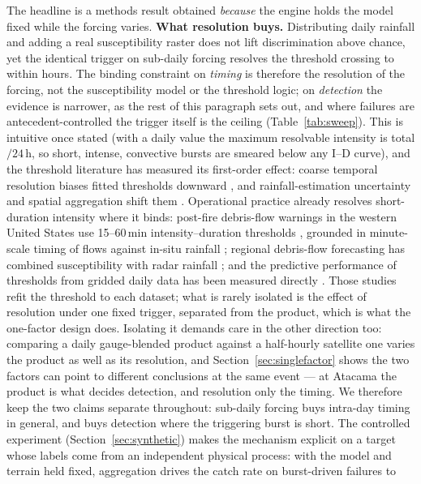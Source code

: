 \documentclass[authoryear,preprint,review,12pt]{elsarticle}
\begin{document}
The headline is a methods result obtained \emph{because} the engine holds the
model fixed while the forcing varies. \textbf{What resolution buys.}
Distributing daily rainfall and adding a real susceptibility raster does not lift
discrimination above chance, yet the identical trigger on sub-daily forcing
resolves the threshold crossing to within hours. The binding constraint on
\emph{timing} is therefore the resolution of the forcing, not the susceptibility model or the
threshold logic; on \emph{detection} the evidence is narrower, as the rest of this paragraph sets out, and where failures are antecedent-controlled the trigger itself is the ceiling (Table~\ref{tab:sweep}). This is intuitive once stated (with a daily value the maximum
resolvable intensity is total$/24$\,h, so short, intense, convective bursts are
smeared below any I--D curve), and the threshold literature has measured its first-order effect: coarse temporal resolution biases fitted thresholds downward \citep{marra2019,gariano2020}, and rainfall-estimation uncertainty and spatial aggregation shift them \citep{nikolopoulos2014,marra2017}. Operational practice already resolves short-duration intensity where it binds:
post-fire debris-flow warnings in the western United States use 15--60\,min
intensity--duration thresholds \citep{staley2017}, grounded in minute-scale
timing of flows against in-situ rainfall \citep{kean2011}; regional debris-flow
forecasting has combined susceptibility with radar rainfall \citep{berenguer2015};
and the predictive performance of thresholds from gridded daily data has been
measured directly \citep{leonarduzzi2017}. Those studies refit the threshold to
each dataset; what is rarely isolated is the effect of resolution under one fixed trigger, separated from the product, which is what the one-factor design does. Isolating it
demands care in the other direction too: comparing a daily gauge-blended product
against a half-hourly satellite one varies the product as well as its resolution,
and Section~\ref{sec:singlefactor} shows the two factors can point to different
conclusions at the same event --- at Atacama the product is what decides detection,
and resolution only the timing. We therefore keep the two claims separate
throughout: sub-daily forcing buys intra-day timing in general, and buys detection
where the triggering burst is short. The
controlled experiment (Section~\ref{sec:synthetic}) makes the mechanism explicit on
a target whose labels come from an independent physical process: with the model and
terrain held fixed, aggregation drives the catch rate on burst-driven failures to
\end{document}
